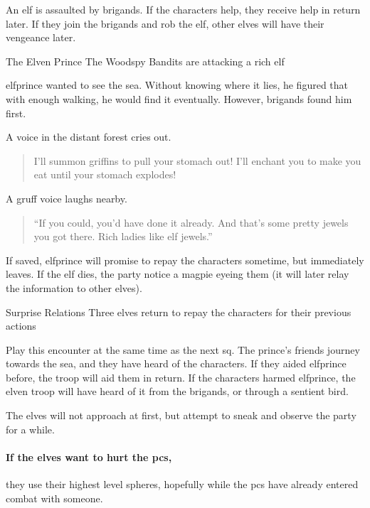 \label{littleprince}

\noindent
An elf is assaulted by brigands.
If the characters help, they receive help in return later.
If they join the brigands and rob the elf, other elves will have their vengeance later.

{The Elven Prince}%
{The Woodspy Bandits are attacking a rich elf}%

\Gls{elfprince} wanted to see the sea.
Without knowing where it lies, he figured that with enough walking, he would find it eventually.
However, brigands found him first.

\begin{boxtext}
  A voice in the distant forest cries out.
  \begin{quote}
    I'll summon griffins to pull your stomach out!  I'll enchant you to make you eat until your stomach explodes!
  \end{quote}

  A gruff voice laughs nearby.

  \begin{quote}
    ``If you could, you'd have done it already.  And that's some pretty jewels you got there.  Rich ladies like elf jewels.''
  \end{quote}

\end{boxtext}


\elfprince

If saved, \gls{elfprince} will promise to repay the characters sometime, but immediately leaves.
If the elf dies, the party notice a magpie eyeing them (it will later relay the information to other elves).

{\squash Surprise Relations}%
{Three elves return to repay the characters for their previous actions}%

Play this encounter at the same time as the next \gls{sq}.
The prince's friends journey towards the sea, and they have heard of the characters.
If they aided \gls{elfprince} before, the troop will aid them in return.
If the characters harmed \gls{elfprince}, the elven troop will have heard of it from the brigands, or through a sentient bird.

The elves will not approach at first, but attempt to sneak and observe the party for a while.

\paragraph{If the elves want to hurt the \glspl{pc},}
they use their highest level spheres, hopefully while the \glspl{pc} have already entered combat with someone.

